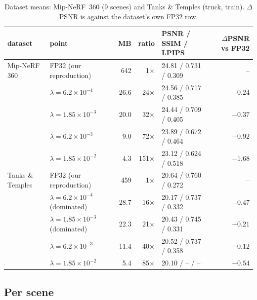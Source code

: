 \documentclass[11pt,a4paper]{article}
\begin{document}
\begin{table}[h]
\centering\small
\caption{Dataset means: Mip-NeRF~360 (9 scenes) and Tanks \& Temples (truck, train). $\Delta$PSNR is against the dataset's own FP32 row.}
\label{tab:headline}
\begin{tabular}{@{}llrrlr@{}}
\toprule
dataset & point & MB & ratio & PSNR / SSIM / LPIPS & $\Delta$PSNR vs FP32 \\
\midrule
Mip-NeRF 360 & FP32 (our reproduction) & 642 & 1$\times$ & 24.81 / 0.731 / 0.309 & -- \\
 & $\lambda = 6.2\times10^{-4}$ & 26.6 & 24$\times$ & 24.56 / 0.717 / 0.385 & $-0.24$ \\
 & $\lambda = 1.85\times10^{-3}$ & 20.0 & 32$\times$ & 24.44 / 0.709 / 0.405 & $-0.37$ \\
 & $\lambda = 6.2\times10^{-3}$ & 9.0 & 72$\times$ & 23.89 / 0.672 / 0.464 & $-0.92$ \\
 & $\lambda = 1.85\times10^{-2}$ & 4.3 & 151$\times$ & 23.12 / 0.624 / 0.518 & $-1.68$ \\
\midrule
Tanks \& Temples & FP32 (our reproduction) & 459 & 1$\times$ & 20.64 / 0.760 / 0.272 & -- \\
 & $\lambda = 6.2\times10^{-4}$ (dominated) & 28.7 & 16$\times$ & 20.17 / 0.737 / 0.332 & $-0.47$ \\
 & $\lambda = 1.85\times10^{-3}$ (dominated) & 22.3 & 21$\times$ & 20.43 / 0.745 / 0.331 & $-0.21$ \\
 & $\lambda = 6.2\times10^{-3}$ & 11.4 & 40$\times$ & 20.52 / 0.737 / 0.358 & $-0.12$ \\
 & $\lambda = 1.85\times10^{-2}$ & 5.4 & 85$\times$ & 20.10 / -- / -- & $-0.54$ \\
\bottomrule
\end{tabular}
\end{table}

\subsection{Per scene}
\label{sec:perscene}
\end{document}
